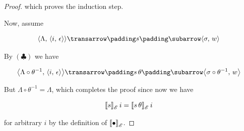 \begin{proof}
  which proves the induction step.

  Now, assume

  \[
  \trans{\inbr{\Lambda,\,\inbr{i,\,\epsilon}}}{s}{\inbr{\sigma,\,w}}
  \]

  By $(\clubsuit)$ we have

  \[
  \trans{\inbr{\Lambda\circ\theta^{-1},\,\inbr{i,\,\epsilon}}}{s\,\theta}{\inbr{\sigma\circ\theta^{-1},\,w}}
  \]

  But $\Lambda\circ\theta^{-1}=\Lambda$, which completes the proof since now we have 

  \[
  \sembr{s}^\ph_\mathscr{E}\,i=\sembr{s\,\theta}^\ph_\mathscr{E}\,i
  \]

  for arbitrary $i$ by the definition of $\sembr{\bullet}^\ph_\mathscr{E}$.
  
\end{proof}

